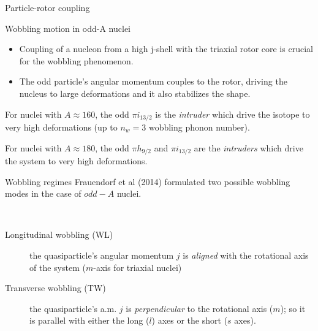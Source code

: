 \documentclass{beamer}
\begin{document}
\begin{frame}{Particle-rotor coupling}
  \begin{block}{Wobbling motion in odd-A nuclei}  
    \begin{itemize}
      \item Coupling of a nucleon from a high j-shell with the triaxial rotor core is crucial for the wobbling phenomenon.
      \item The odd particle’s angular momentum couples to the rotor, driving the nucleus to large deformations and it also stabilizes the shape.
    \end{itemize}
  \end{block}
  For nuclei with $A\approx160$, the odd $\pi i_{13/2}$ is the \emph{intruder} which drive the isotope to very high deformations (up to $n_w=3$ wobbling phonon number).
  
  For nuclei with $A\approx180$, the odd $\pi h_{9/2}$ and $\pi i_{13/2}$ are the \emph{intruders} which drive the system to very high deformations.
\end{frame}


\begin{frame}{Wobbling regimes}
  Frauendorf et al (2014) formulated two possible wobbling modes in the case of $odd-A$ nuclei.
  \begin{block}{$\ $}
    \begin{description}
      \item[Longitudinal wobbling (WL)] the quasiparticle's angular momentum $j$ is \emph{aligned} with the rotational axis of the system ($m$-axis for triaxial nuclei)
      \item[Transverse wobbling (TW)] the quasiparticle's a.m. $j$ is \emph{perpendicular} to the rotational axis ($m$); so it is parallel with either the long ($l$) axes or the short ($s$ axes). 
    \end{description}
  \end{block}
\end{frame}
\end{document}
